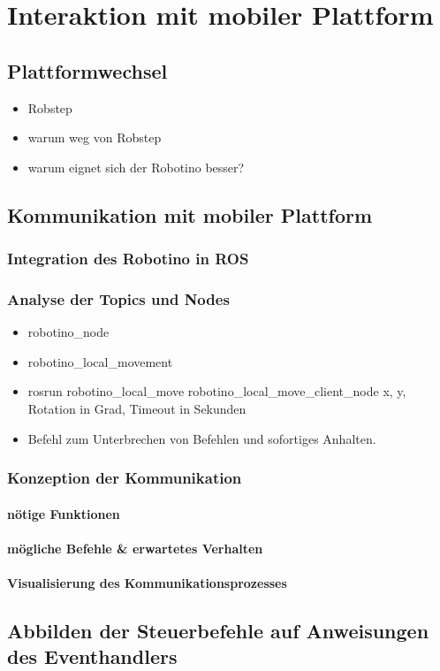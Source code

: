\chapter{Interaktion mit mobiler Plattform}
	\section{Plattformwechsel}
	\begin{itemize}
	\item Robstep
	\item warum weg von Robstep
	\item warum eignet sich der Robotino besser?
	\end{itemize}
	\section{Kommunikation mit mobiler Plattform}
		\subsection{Integration des Robotino in ROS}
		\subsection{Analyse der Topics und Nodes}
			\begin{itemize}
			\item robotino\_node
			\item robotino\_local\_movement
			\item rosrun robotino\_local\_move robotino\_local\_move\_client\_node x, y, Rotation in Grad, Timeout in Sekunden
			\item Befehl zum Unterbrechen von Befehlen und sofortiges Anhalten.
			\end{itemize}
		\subsection{Konzeption der Kommunikation}
			\subsubsection{nötige Funktionen}
			\subsubsection{mögliche Befehle \& erwartetes Verhalten}
			\subsubsection{Visualisierung des Kommunikationsprozesses}
	\section{Abbilden der Steuerbefehle auf Anweisungen des Eventhandlers}
	